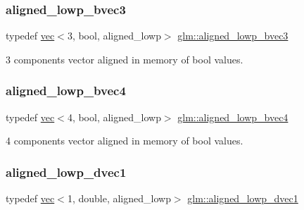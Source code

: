 \subsubsection{\texorpdfstring{aligned\+\_\+lowp\+\_\+bvec3}{aligned\_lowp\_bvec3}}
{\footnotesize\ttfamily typedef \mbox{\hyperlink{structglm_1_1vec}{vec}}$<$3, bool, aligned\+\_\+lowp$>$ \mbox{\hyperlink{group__gtc__type__aligned_ga83e413f4dd427d7b3fcbb531fce722be}{glm\+::aligned\+\_\+lowp\+\_\+bvec3}}}



3 components vector aligned in memory of bool values. 

\mbox{\label{group__gtc__type__aligned_ga7584318e96ebbf1e7649a7af7724ecca}} 
\subsubsection{\texorpdfstring{aligned\+\_\+lowp\+\_\+bvec4}{aligned\_lowp\_bvec4}}
{\footnotesize\ttfamily typedef \mbox{\hyperlink{structglm_1_1vec}{vec}}$<$4, bool, aligned\+\_\+lowp$>$ \mbox{\hyperlink{group__gtc__type__aligned_ga7584318e96ebbf1e7649a7af7724ecca}{glm\+::aligned\+\_\+lowp\+\_\+bvec4}}}



4 components vector aligned in memory of bool values. 

\mbox{\label{group__gtc__type__aligned_gaa0811727b30ac5c917d48f43354f2d1f}} 
\subsubsection{\texorpdfstring{aligned\+\_\+lowp\+\_\+dvec1}{aligned\_lowp\_dvec1}}
{\footnotesize\ttfamily typedef \mbox{\hyperlink{structglm_1_1vec}{vec}}$<$1, double, aligned\+\_\+lowp$>$ \mbox{\hyperlink{group__gtc__type__aligned_gaa0811727b30ac5c917d48f43354f2d1f}{glm\+::aligned\+\_\+lowp\+\_\+dvec1}}}




